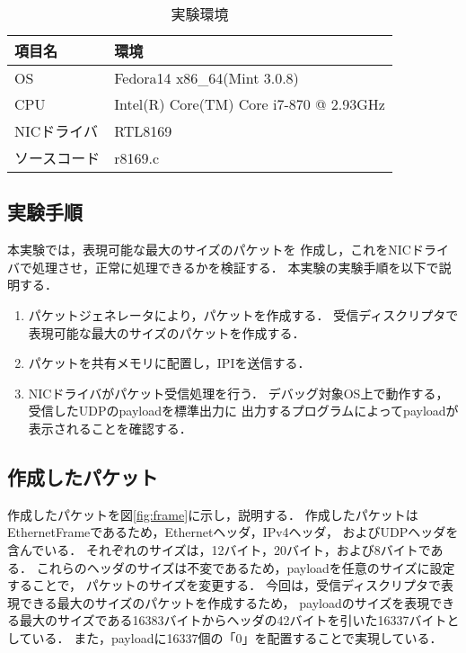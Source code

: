 \documentclass[12pt]{jsarticle}
\begin{document}
\begin{table}[htbp]
\caption{実験環境}
\label{kankyou}
\begin{center}
\begin{tabular}{l|l}   \hline \hline 
項目名      & 環境    \\ \hline
OS          & Fedora14 x86\_64(Mint 3.0.8)  \\ 
CPU         & Intel(R) Core(TM) Core i7-870 @ 2.93GHz \\ 
NICドライバ & RTL8169    \\ 
ソースコード& r8169.c \\ \hline
           
\end{tabular}
\end{center}
\end{table}

\subsection{実験手順}
本実験では，表現可能な最大のサイズのパケットを
作成し，これをNICドライバで処理させ，正常に処理できるかを検証する．
本実験の実験手順を以下で説明する．
\begin{enumerate}
    \item パケットジェネレータにより，パケットを作成する．
        受信ディスクリプタで表現可能な最大のサイズのパケットを作成する．
    \item パケットを共有メモリに配置し，IPIを送信する．
    \item NICドライバがパケット受信処理を行う．
        デバッグ対象OS上で動作する，受信したUDPのpayloadを標準出力に
        出力するプログラムによってpayloadが表示されることを確認する．
\end{enumerate}

\subsection{作成したパケット}
作成したパケットを図\ref{fig:frame}に示し，説明する．
作成したパケットはEthernetFrameであるため，Ethernetヘッダ，IPv4ヘッダ，
およびUDPヘッダを含んでいる．
それぞれのサイズは，12バイト，20バイト，および8バイトである．
これらのヘッダのサイズは不変であるため，payloadを任意のサイズに設定することで，
パケットのサイズを変更する．
今回は，受信ディスクリプタで表現できる最大のサイズのパケットを作成するため，
payloadのサイズを表現できる最大のサイズである16383バイトからヘッダの42バイトを引いた16337バイトとしている．
また，payloadに16337個の「0」を配置することで実現している．
\end{document}
